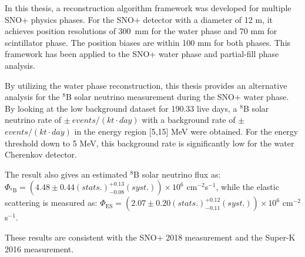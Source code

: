 In this thesis, a reconstruction algorithm framework was developed for multiple SNO+ physics phases. For the SNO+ detector with a diameter of 12 m, it achieves position resolutions of 300~mm for the water phase and 70 mm for scintillator phase. The position biases are within 100 mm for both phases. This framework has been applied to the SNO+ water phase and partial-fill phase analysis. 

By utilizing the water phase reconstruction, this thesis provides an alternative analysis for the $^8$B solar neutrino measurement during the SNO+ water phase. By looking at the low background dataset for 190.33 live days, a $^8$B solar neutrino rate of $ \pm~events/(kt\cdot day)$ with a background rate of $ \pm $ $events/(kt\cdot day)$ in the energy region [5,15] MeV were obtained. For the energy threshold down to 5 MeV, this background rate is significantly low for the water Cherenkov detector.

The result also gives an estimated $^8$B solar neutrino flux as: $\Phi_{\mathrm{^8B}}=(4.48 \pm 0.44(stats.)^{+0.13}_{-0.08}(syst.))\times10^6$ cm$^{-2}$s$^{-1}$, 
while the elastic scattering is measured as: $\Phi_{\mathrm{ES}}=(2.07 \pm 0.20(stats.)^{+0.12}_{-0.11}(syst.))\times10^6$ cm$^{-2}$s$^{-1}$.
 
 These results are consistent with the SNO+ 2018 measurement\cite{anderson2019measurement} and the Super-K 2016 measurement\cite{abe2016solar}.